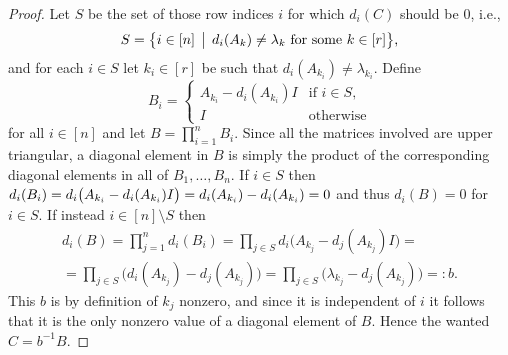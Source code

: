 \documentclass[12pt]{article}
\begin{document}
\begin{proof}
  Let $S$ be the set of those row indices $i$ for which $d_i(C)$ 
  should be $0$, i.e.,
  $$
    S = \bigl\{ i \in [n] \,\bigm|\, 
      \text{\(d_i(A_k) \neq \lambda_k\) for some \(k \in [r]\)}
    \bigr\}
    \text{,}
  $$
  and for each \(i \in S\) let \(k_i \in [r]\) be such that 
  \(d_i(A_{k_i}) \neq \lambda_{k_i}\). Define
  $$
    B_i = \begin{cases}
      A_{k_i} - d_i(A_{k_i})I & \text{if \(i \in S\),}\\
      I& \text{otherwise}
    \end{cases}
  $$
  for all \(i \in [n]\) and let \(B = \prod_{i=1}^n B_i\). Since all 
  the matrices involved are upper triangular, a diagonal element in $B$ 
  is simply the product of the corresponding diagonal elements in all 
  of $B_1,\dotsc,B_n$. If \(i \in S\) then \(d_i(B_i) = 
  d_i\bigl( A_{k_i} -\nobreak d_i(A_{k_i}) I\bigr) = 
  d_i(A_{k_i}) - d_i(A_{k_i}) = 0\) and thus \(d_i(B) = 0\) for \(i 
  \in S\). If instead \(i \in [n] \setminus S\) then
  \begin{multline*}
    d_i(B) = 
    \prod_{j=1}^n d_i(B_i) =
    \prod_{j \in S} d_i\bigl( A_{k_j} - d_j(A_{k_j})I \bigr) = \\ =
    \prod_{j \in S} \bigl( d_i(A_{k_j}) - d_j(A_{k_j}) \bigr) =
    \prod_{j \in S} \bigl( \lambda_{k_j} - d_j(A_{k_j}) \bigr) =: b
    \text{.}
  \end{multline*}
  This $b$ is by definition of $k_j$ nonzero, and since it is 
  independent of $i$ it follows that it is the only nonzero value of a 
  diagonal element of $B$. Hence the wanted \(C = b^{-1} B\).
\end{proof}
\end{document}
